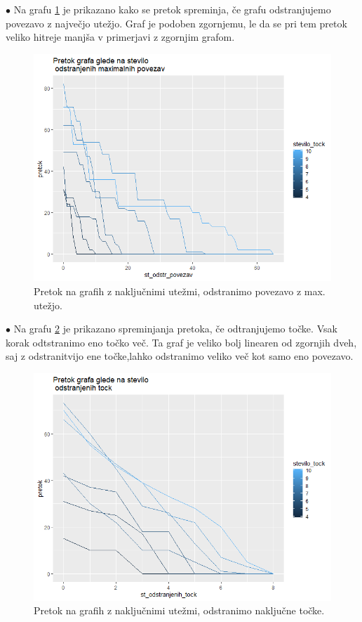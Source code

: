 \documentclass[a4paper]{article}
\begin{document}
\pagebreak
$\bullet $ Na grafu \ref{fig4} je prikazano kako se pretok spreminja, če grafu odstranjujemo povezavo z največjo utežjo. Graf je podoben zgornjemu, le da se pri tem pretok veliko hitreje manjša v primerjavi z zgornjim grafom. 
\begin{figure}[H]
\centerline{\includegraphics[scale=.5]{p4.PNG}}
\caption{Pretok na grafih z naključnimi utežmi, odstranimo povezavo z max. utežjo. }
\label{fig4}
\end{figure}

$\bullet $ Na grafu \ref{fig5} je prikazano spreminjanja pretoka, če odtranjujemo točke. Vsak korak odtstranimo eno točko več. Ta graf je veliko bolj linearen od zgornjih dveh, saj z odstranitvijo ene točke,lahko odstranimo veliko več kot samo eno povezavo. 
\begin{figure}[H]
\centerline{\includegraphics[scale=.5]{p5.PNG}}
\caption{Pretok na grafih z naključnimi utežmi, odstranimo naključne točke.}
\label{fig5}
\end{figure}
\end{document}

